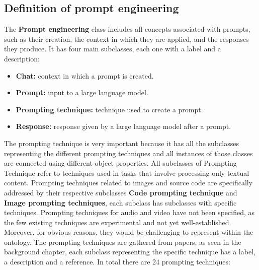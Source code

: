 \subsection{Definition of prompt engineering}
The \textbf{Prompt engineering} class includes all concepts associated with prompts, such as their creation, the context in which they are applied, and the responses they produce. It has four main subclasses, each one with a label and a description:
\begin{itemize}
    \item \textbf{Chat:} context in which a prompt is created. 
    \item \textbf{Prompt:} input to a large language model.
    \item \textbf{Prompting technique:} technique used to create a prompt.
    \item \textbf{Response:} response given by a large language model after a prompt.
\end{itemize}
The prompting technique is very important because it has all the subclasses representing the different prompting techniques and all instances of those classes are connected using different object properties. All subclasses of Prompting Technique refer to techniques used in tasks that involve processing only textual content. Prompting techniques related to images and source code are specifically addressed by their respective subclasses \textbf{Code prompting technique} and \textbf{Image prompting techniques}, each subclass has subclasses with specific techniques. Prompting techniques for audio and video have not been specified, as the few existing techniques are experimental and not yet well-established. Moreover, for obvious reasons, they would be challenging to represent within the ontology. The prompting techniques are gathered from papers, as seen in the background chapter, each subclass representing the specific technique has a label, a description and a reference. In total there are 24 prompting techniques:

